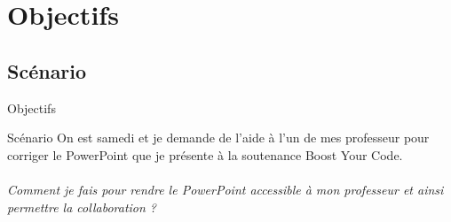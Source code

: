 \section{Objectifs}

\subsection{Scénario}
\begin{frame}{Objectifs}
  \begin{block}{Scénario}
  On est samedi et je demande de l'aide à l'un de mes professeur pour corriger 
  le PowerPoint que je présente à la soutenance Boost Your Code.\\
  ~\\
  \emph{Comment je fais pour rendre le PowerPoint accessible à mon professeur et
  ainsi permettre la collaboration ?}
  \end{block}
\end{frame}

